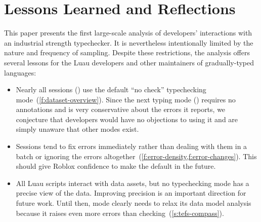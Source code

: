 \documentclass[english,submission,cleveref]{programming}
\begin{document}




\section{Lessons Learned and Reflections}
\label{s:conclusion}

This paper presents the first large-scale analysis of developers' interactions with
an industrial strength typechecker. It is nevertheless intentionally
limited by the nature and frequency of sampling. Despite these restrictions,
the analysis offers several lessons for the Luau
developers and other maintainers of gradually-typed languages:
\begin{itemize}
  \item
    Nearly all sessions () use the default ``no check''
    typechecking mode~(\cref{f:dataset-overview}).
    Since the next typing mode (\mnonstrict{}) requires no annotations and is
    very conservative about the errors it reports, we conjecture that
    developers would have no objections to using it and are simply unaware that
    other modes exist.
  \item
    Sessions tend to fix errors immediately rather than dealing with them in a batch
    or ignoring the errors altogether~(\cref{f:error-density,f:error-changes}).
    This should give Roblox confidence to make \mnonstrict{} the default in the future.
  \item
    All Luau scripts interact with data assets, but no typechecking mode
    has a precise view of the data.
    Improving precision is an important direction for future work.
    Until then, \mstrict{} mode clearly needs to relax its data model
    analysis because it raises even more errors than \FS{} checking~(\cref{s:tefs-compass}).
\end{itemize}
\end{document}

